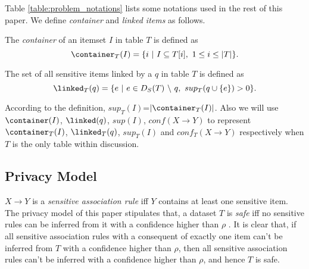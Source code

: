 {%
Table \ref{table:problem_notations} lists some notations used in the
rest of this paper. We define {\em container} and {\em linked items}
as follows.

\begin{definition}[Container]
The \emph{container} of an itemset $I$ in table $T$ is defined as
\begin{equation}
\container_T(I) = \{ i ~|~ I \subseteq T[i],~ 1 \leq i \leq |T| \}
.
\end{equation}
\end{definition}

\begin{definition}
The set of all sensitive items linked by a \qid $q$ in table $T$ is defined as
\begin{equation}
\linked_T(q) = \{ e ~|~ e \in D_S(T) ~\backslash~ q,~ sup_{T}(q\cup\{e\}) > 0 \}.
\end{equation}
\end{definition}

According to the definition, $sup_{T}(I)$=$|\container_T(I)|$.
Also we will use $\container(I)$, $\linked(q)$, $sup(I)$,
$conf(X \rightarrow Y)$ to represent $\container_T(I)$,
$\linked_T(q)$, $sup_{T}(I)$ and $conf_{T}(X \rightarrow Y)$ respectively
when $T$ is the only table within discussion.
}%

\subsection{Privacy Model}
$X \rightarrow Y$ is a {\em sensitive association rule} iff $Y$ contains
at least one sensitive item.
The privacy model of this paper
stipulates that, a dataset $T$ is {\em safe} iff no sensitive rules can be inferred from it
with a confidence higher than $\rho$ \cite{Cao:2010:rho}.
It is clear that,
if all sensitive association rules with a consequent of exactly one item can't be inferred from $T$ 
with a confidence higher than $\rho$, then all sensitive association rules 
can't be inferred with a confidence higher than $\rho$, and hence $T$ is safe.

